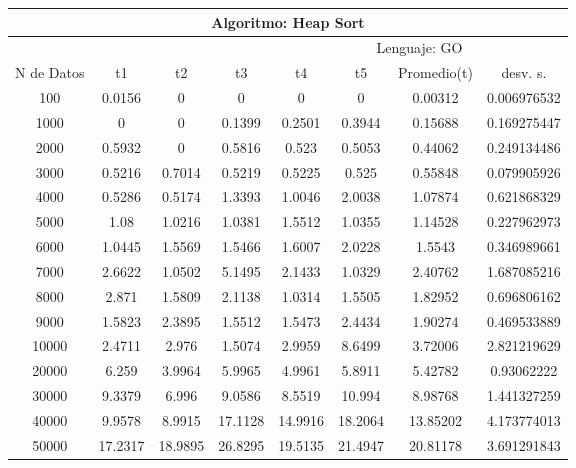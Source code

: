 \documentclass{article}
\begin{document}
\begin{table}[]
\begin{tabular}{|c|c|c|c|c|c|c|c| }
    \end{tabular}
    \end{table}
    
             \begin{table}[]
        \begin{tabular}{|c|c|c|c|c|c|c|c| }
            \hline
            \multicolumn{8}{|c|}{Algoritmo: Heap Sort} \\ \hline
            \multicolumn{4}{|c|}{} & \multicolumn{4}{c|}{Lenguaje: GO} \\ \hline
              N de Datos &     t1    &  t2         &  t3          &   t4        &    t5     &   Promedio(t)       & desv. s. \\ \hline       
                100	&0.0156	&0	&0	&0	&0	&0.00312	&0.006976532\\ \hline
                1000	&0	&0	&0.1399	&0.2501	&0.3944	&0.15688	&0.169275447\\ \hline
                2000	&0.5932	&0	&0.5816	&0.523	&0.5053	&0.44062	&0.249134486\\ \hline
                3000	&0.5216	&0.7014	&0.5219	&0.5225	&0.525	&0.55848	&0.079905926\\ \hline
                4000	&0.5286	&0.5174	&1.3393	&1.0046	&2.0038	&1.07874	&0.621868329\\ \hline
                5000	&1.08	&1.0216	&1.0381	&1.5512	&1.0355	&1.14528	&0.227962973\\ \hline
                6000	&1.0445	&1.5569	&1.5466	&1.6007	&2.0228	&1.5543	&0.346989661\\ \hline
                7000	&2.6622	&1.0502	&5.1495	&2.1433	&1.0329	&2.40762	&1.687085216\\ \hline
                8000	&2.871	&1.5809	&2.1138	&1.0314	&1.5505	&1.82952	&0.696806162\\ \hline
                9000	&1.5823	&2.3895	&1.5512	&1.5473	&2.4434	&1.90274	&0.469533889\\ \hline
                10000	&2.4711	&2.976	&1.5074	&2.9959	&8.6499	&3.72006	&2.821219629\\ \hline
                20000	&6.259	&3.9964	&5.9965	&4.9961	&5.8911	&5.42782	&0.93062222\\ \hline
                30000	&9.3379	&6.996	&9.0586	&8.5519	&10.994	&8.98768	&1.441327259\\ \hline
                40000	&9.9578	&8.9915	&17.1128	&14.9916	&18.2064	&13.85202&	4.173774013\\ \hline
                50000	&17.2317	&18.9895	&26.8295	&19.5135	&21.4947	&20.81178&	3.691291843\\ \hline

\end{tabular}
\end{table}
\end{document}
